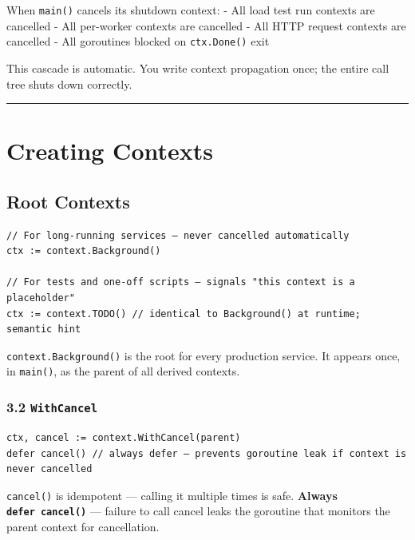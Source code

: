 \documentclass[11pt,a4paper,oneside]{book}
\begin{document}
When \texttt{main()} cancels its shutdown context: - All load test run
contexts are cancelled - All per-worker contexts are cancelled - All
HTTP request contexts are cancelled - All goroutines blocked on
\texttt{ctx.Done()} exit

This cascade is automatic. You write context propagation once; the
entire call tree shuts down correctly.

\begin{center}\rule{0.5\linewidth}{0.5pt}\end{center}

\section{Creating Contexts}

\subsection{Root Contexts}

\begin{verbatim}
// For long-running services — never cancelled automatically
ctx := context.Background()

// For tests and one-off scripts — signals "this context is a placeholder"
ctx := context.TODO() // identical to Background() at runtime; semantic hint
\end{verbatim}

\texttt{context.Background()} is the root for every production service.
It appears once, in \texttt{main()}, as the parent of all derived
contexts.

\subsubsection{\texorpdfstring{3.2
\texttt{WithCancel}}{3.2 WithCancel}}

\begin{verbatim}
ctx, cancel := context.WithCancel(parent)
defer cancel() // always defer — prevents goroutine leak if context is never cancelled
\end{verbatim}

\texttt{cancel()} is idempotent --- calling it multiple times is safe.
\textbf{Always \texttt{defer\ cancel()}} --- failure to call cancel
leaks the goroutine that monitors the parent context for cancellation.
\end{document}
